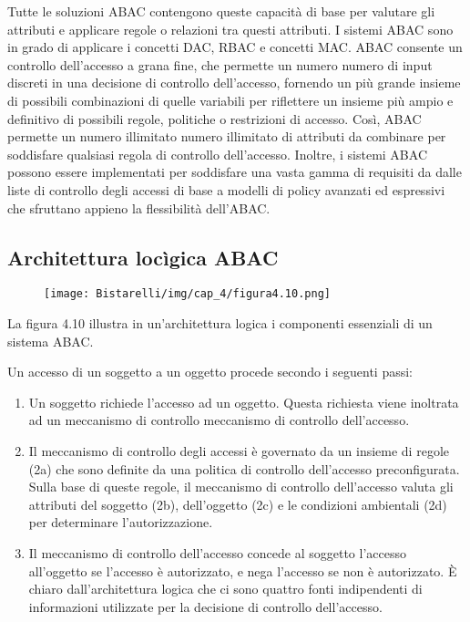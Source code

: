 Tutte le soluzioni ABAC contengono queste capacità di base per valutare gli attributi e applicare regole o relazioni tra questi attributi. I sistemi ABAC sono in grado di applicare i concetti DAC, RBAC e concetti MAC. ABAC consente un controllo dell'accesso a grana fine, che permette un numero numero di input discreti in una decisione di controllo dell'accesso, fornendo un più grande insieme di possibili combinazioni di quelle variabili per riflettere un insieme più ampio e definitivo di possibili regole, politiche o restrizioni di accesso. Così, ABAC permette un numero illimitato numero illimitato di attributi da combinare per soddisfare qualsiasi regola di controllo dell'accesso. Inoltre, i sistemi ABAC possono essere implementati per soddisfare una vasta gamma di requisiti da dalle liste di controllo degli accessi di base a modelli di policy avanzati ed espressivi che sfruttano appieno la flessibilità dell'ABAC.

\newpage
\subsection{Architettura locìgica ABAC}
\begin{figure}[H]
	\centering
    \texttt{[image: Bistarelli/img/cap\_4/figura4.10.png]}
\end{figure}

La figura 4.10 illustra in un'architettura logica i componenti essenziali di un sistema ABAC.

\singlespacing

Un accesso di un soggetto a un oggetto procede secondo i seguenti passi:

\begin{enumerate}

    \item Un soggetto richiede l'accesso ad un oggetto. Questa richiesta viene inoltrata ad un meccanismo di controllo meccanismo di controllo dell'accesso.
    
    \item Il meccanismo di controllo degli accessi è governato da un insieme di regole (2a) che sono definite da una politica di controllo dell'accesso preconfigurata. Sulla base di queste regole, il meccanismo di controllo dell'accesso valuta gli attributi del soggetto (2b), dell'oggetto (2c) e le condizioni ambientali (2d) per determinare l'autorizzazione.
    
    \item Il meccanismo di controllo dell'accesso concede al soggetto l'accesso all'oggetto se l'accesso è autorizzato, e nega l'accesso se non è autorizzato. È chiaro dall'architettura logica che ci sono quattro fonti indipendenti di informazioni utilizzate per la decisione di controllo dell'accesso.

\end{enumerate}


